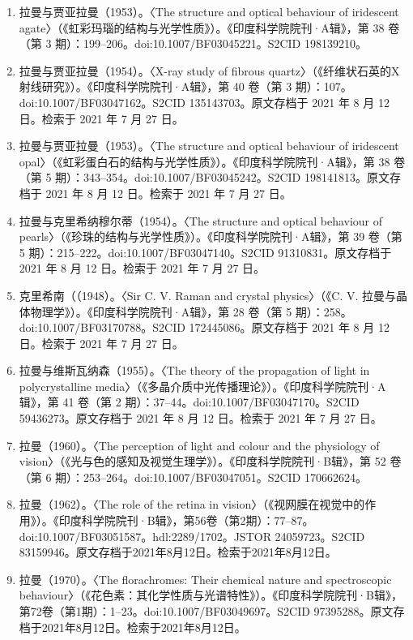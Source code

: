 \begin{enumerate}
\item 拉曼与贾亚拉曼（1953）。〈The structure and optical behaviour of iridescent agate〉（《虹彩玛瑙的结构与光学性质》）。《印度科学院院刊·A辑》，第 38 卷（第 3 期）：199–206。doi:10.1007/BF03045221。S2CID 198139210。
\item 拉曼与贾亚拉曼（1954）。〈X-ray study of fibrous quartz〉（《纤维状石英的X射线研究》）。《印度科学院院刊·A辑》，第 40 卷（第 3 期）：107。doi:10.1007/BF03047162。S2CID 135143703。原文存档于 2021 年 8 月 12 日。检索于 2021 年 7 月 27 日。
\item 拉曼与贾亚拉曼（1953）。〈The structure and optical behaviour of iridescent opal〉（《虹彩蛋白石的结构与光学性质》）。《印度科学院院刊·A辑》，第 38 卷（第 5 期）：343–354。doi:10.1007/BF03045242。S2CID 198141813。原文存档于 2021 年 8 月 12 日。检索于 2021 年 7 月 27 日。
\item 拉曼与克里希纳穆尔蒂（1954）。〈The structure and optical behaviour of pearls〉（《珍珠的结构与光学性质》）。《印度科学院院刊·A辑》，第 39 卷（第 5 期）：215–222。doi:10.1007/BF03047140。S2CID 91310831。原文存档于 2021 年 8 月 12 日。检索于 2021 年 7 月 27 日。
\item 克里希南（（1948）。〈Sir C. V. Raman and crystal physics〉（《C. V. 拉曼与晶体物理学》）。《印度科学院院刊·A辑》，第 28 卷（第 5 期）：258。doi:10.1007/BF03170788。S2CID 172445086。原文存档于 2021 年 8 月 12 日。检索于 2021 年 7 月 27 日。
\item 拉曼与维斯瓦纳森（1955）。〈The theory of the propagation of light in polycrystalline media〉（《多晶介质中光传播理论》）。《印度科学院院刊·A辑》，第 41 卷（第 2 期）：37–44。doi:10.1007/BF03047170。S2CID 59436273。原文存档于 2021 年 8 月 12 日。检索于 2021 年 7 月 27 日。
\item 拉曼（1960）。〈The perception of light and colour and the physiology of vision〉（《光与色的感知及视觉生理学》）。《印度科学院院刊·B辑》，第 52 卷（第 6 期）：253–264。doi:10.1007/BF03047051。S2CID 170662624。
\item 拉曼（1962）。〈The role of the retina in vision〉（《视网膜在视觉中的作用》）。《印度科学院院刊·B辑》，第56卷（第2期）：77–87。doi:10.1007/BF03051587。hdl:2289/1702。JSTOR 24059723。S2CID 83159946。原文存档于2021年8月12日。检索于2021年8月12日。
\item 拉曼（1970）。〈The florachromes: Their chemical nature and spectroscopic behaviour〉（《花色素：其化学性质与光谱特性》）。《印度科学院院刊·B辑》，第72卷（第1期）：1–23。doi:10.1007/BF03049697。S2CID 97395288。原文存档于2021年8月12日。检索于2021年8月12日。

\end{enumerate}
